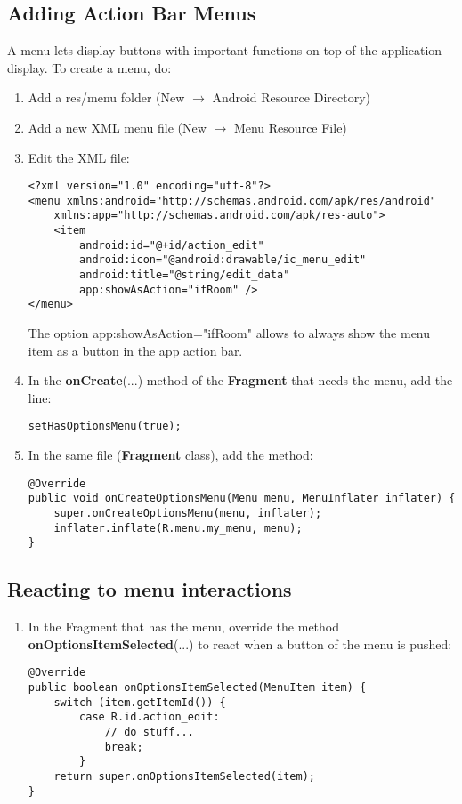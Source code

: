\documentclass[11pt]{article}
\begin{document}
\subsection{Adding Action Bar Menus}
A menu lets display buttons with important functions on top of the application display. To create a menu, do: 
\begin{enumerate}
    \item Add a res/menu folder (New $\rightarrow$ Android Resource Directory)
    \item Add a new XML menu file (New $\rightarrow$ Menu Resource File)
    \item Edit the XML file:
        \lstset{language = XML}
    \begin{lstlisting}
<?xml version="1.0" encoding="utf-8"?>
<menu xmlns:android="http://schemas.android.com/apk/res/android"
    xmlns:app="http://schemas.android.com/apk/res-auto">
    <item
        android:id="@+id/action_edit"
        android:icon="@android:drawable/ic_menu_edit"
        android:title="@string/edit_data"
        app:showAsAction="ifRoom" />
</menu>
    \end{lstlisting}
    The option app:showAsAction="ifRoom" allows to always show the menu item as a button in the app action bar.
    
    \item In the \textbf{onCreate}(...) method of the \textbf{Fragment} that needs the menu, add the line:
    \lstset{language = Java}
    \begin{lstlisting}
setHasOptionsMenu(true);
    \end{lstlisting}
    
    \item In the same file (\textbf{Fragment} class), add the method:
    \lstset{language = Java}
    \begin{lstlisting}
@Override
public void onCreateOptionsMenu(Menu menu, MenuInflater inflater) {
    super.onCreateOptionsMenu(menu, inflater);
    inflater.inflate(R.menu.my_menu, menu);
}
    \end{lstlisting}
    
\end{enumerate}

\subsection{Reacting to menu interactions}
\begin{enumerate}
    \item In the Fragment that has the menu, override the method \textbf{onOptionsItemSelected}(...) to react when a button of the menu is pushed:
    \lstset{language = Java}
    \begin{lstlisting}
@Override
public boolean onOptionsItemSelected(MenuItem item) {
    switch (item.getItemId()) {
        case R.id.action_edit:
            // do stuff...
            break;
        }
    return super.onOptionsItemSelected(item);
}
    \end{lstlisting}
\end{enumerate}
\end{document}
